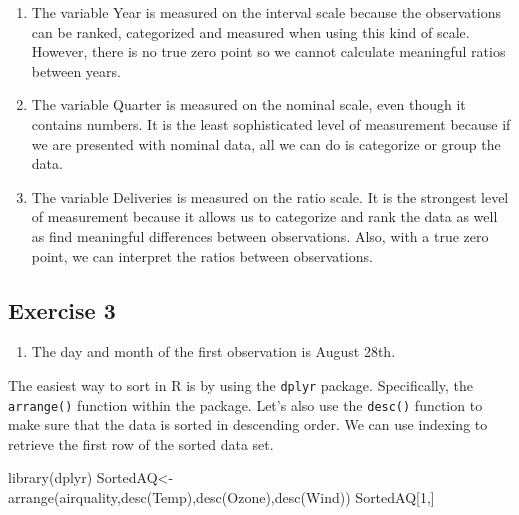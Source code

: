 \documentclass[
  letterpaper,
  DIV=11,
  numbers=noendperiod]{scrreprt}
\newenvironment{Shaded}{\begin{snugshade}}{\end{snugshade}}
\newcommand{\DecValTok}[1]{\textcolor[rgb]{0.68,0.00,0.00}{#1}}
\newcommand{\FunctionTok}[1]{\textcolor[rgb]{0.28,0.35,0.67}{#1}}
\newcommand{\NormalTok}[1]{\textcolor[rgb]{0.00,0.23,0.31}{#1}}
\newcommand{\OtherTok}[1]{\textcolor[rgb]{0.00,0.23,0.31}{#1}}
\providecommand{\tightlist}{%
  \setlength{\itemsep}{0pt}\setlength{\parskip}{0pt}}\usepackage{longtable,booktabs,array}
\begin{document}
\begin{enumerate}
\def\labelenumi{\arabic{enumi}.}
\item
  The variable Year is measured on the interval scale because the
  observations can be ranked, categorized and measured when using this
  kind of scale. However, there is no true zero point so we cannot
  calculate meaningful ratios between years.
\item
  The variable Quarter is measured on the nominal scale, even though it
  contains numbers. It is the least sophisticated level of measurement
  because if we are presented with nominal data, all we can do is
  categorize or group the data.
\item
  The variable Deliveries is measured on the ratio scale. It is the
  strongest level of measurement because it allows us to categorize and
  rank the data as well as find meaningful differences between
  observations. Also, with a true zero point, we can interpret the
  ratios between observations.
\end{enumerate}

\hypertarget{exercise-3-1}{%
\subsection*{Exercise 3}\label{exercise-3-1}}

\begin{enumerate}
\def\labelenumi{\arabic{enumi}.}
\tightlist
\item
  The day and month of the first observation is August 28th.
\end{enumerate}

The easiest way to sort in R is by using the \texttt{dplyr} package.
Specifically, the \texttt{arrange()} function within the package. Let's
also use the \texttt{desc()} function to make sure that the data is
sorted in descending order. We can use indexing to retrieve the first
row of the sorted data set.

\begin{Shaded}
\begin{Highlighting}[numbers=left,,]
\FunctionTok{library}\NormalTok{(dplyr)}
\NormalTok{SortedAQ}\OtherTok{\textless{}{-}}\FunctionTok{arrange}\NormalTok{(airquality,}\FunctionTok{desc}\NormalTok{(Temp),}\FunctionTok{desc}\NormalTok{(Ozone),}\FunctionTok{desc}\NormalTok{(Wind))}
\NormalTok{SortedAQ[}\DecValTok{1}\NormalTok{,]}
\end{Highlighting}
\end{Shaded}
\end{document}
